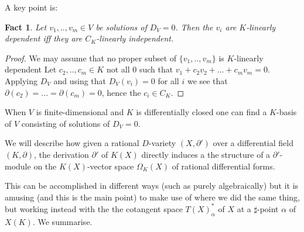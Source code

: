 \documentclass[12pt]{article}
\newtheorem{Fact}[Theorem]{Fact}
\begin{document}
 A key point is:
\begin{Fact} Let $v_{1},..,v_{m}\in V$ be solutions of $D_{V} = 0$. Then the $v_{i}$ are $K$-linearly dependent iff they are $C_{K}$-linearly independent. 
\end{Fact} 
\begin{proof}   We may assume that no proper subset of $\{v_{1},..,v_{m}\}$ is $K$-linearly dependent
Let $c_{2},..,c_{m}\in K$ not all $0$ such that $v_{1} + c_{2}v_{2} + ... + c_{m}v_{m} = 0$.  Applying $D_{V}$ and using that $D_{V}(v_{i}) = 0$ for all $i$ we see that
$\partial(c_{2}) = ... = \partial (c_{m}) = 0$, hence the $c_{i}\in C_{K}$. 
\end{proof} 

When $V$ is finite-dimensional and $K$ is differentially closed one can find a $K$-basis of $V$ consisting of solutions of $D_{V} = 0$. 

We  will describe how given a rational $D$-variety $(X,\partial ')$ over a differential field  $(K,\partial)$,  the derivation $\partial '$ of $K(X)$ directly induces a the structure of a $\partial '$-module on the $K(X)$-vector space $\Omega_{K}(X)$ of rational differential forms. 

This can be accomplished in different ways (such as purely algebraically) but it is amusing (and this is the main point) to make use of \cite{Pillay-Ziegler} where we did the same thing, but working instead with the
the cotangent space  $T(X)_{\alpha}^{*}$ of $X$ at a $\sharp$-point $\alpha$ of $X(K)$.  We summarise. 
\end{document}
